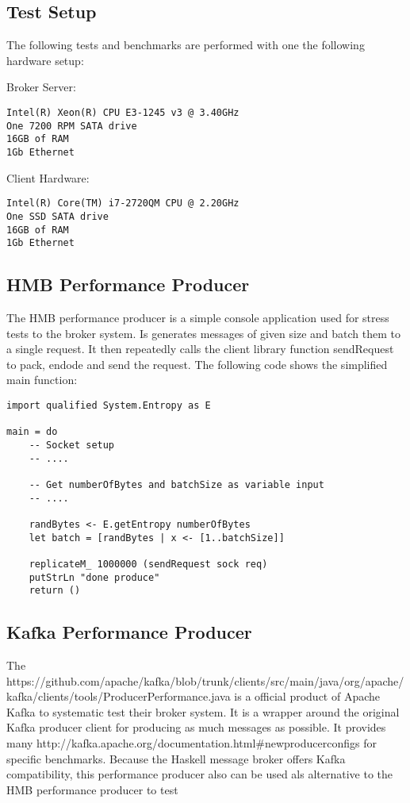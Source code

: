 \subsection{Test Setup}
The following tests and benchmarks are performed with one the following
hardware setup:

Broker Server:
\begin{verbatim}
Intel(R) Xeon(R) CPU E3-1245 v3 @ 3.40GHz
One 7200 RPM SATA drive
16GB of RAM
1Gb Ethernet 
\end{verbatim}

Client Hardware:
\begin{verbatim}
Intel(R) Core(TM) i7-2720QM CPU @ 2.20GHz
One SSD SATA drive
16GB of RAM 
1Gb Ethernet
\end{verbatim}

\subsection{HMB Performance Producer}
\label{conc-eval-hmbperformanceprod}
The HMB performance producer is a simple console application used for stress
tests to the broker system. Is generates messages of given size and batch them
to a single request. It then repeatedly calls the client library function
sendRequest to pack, endode and send the request. The following code shows the
simplified main function: 

\begin{lstlisting}
import qualified System.Entropy as E

main = do 
    -- Socket setup 
    -- ....

    -- Get numberOfBytes and batchSize as variable input 
    -- ....

    randBytes <- E.getEntropy numberOfBytes 
    let batch = [randBytes | x <- [1..batchSize]]

    replicateM_ 1000000 (sendRequest sock req) 
    putStrLn "done produce"
    return ()

\end{lstlisting}

\subsection{Kafka Performance Producer}
\label{conc-eval-kafkaperformanceprod}
The 
{https://github.com/apache/kafka/blob/trunk/clients/src/main/java/org/apache/kafka/clients/tools/ProducerPerformance.java}
is a official product of Apache Kafka to systematic test their broker
system. It is a wrapper around the original Kafka producer client for producing
as much messages as possible. It provides many 
{http://kafka.apache.org/documentation.html\#newproducerconfigs} for specific
benchmarks. Because the Haskell message broker offers Kafka compatibility,  this
performance producer also can be used als alternative to the HMB performance
producer to test 

